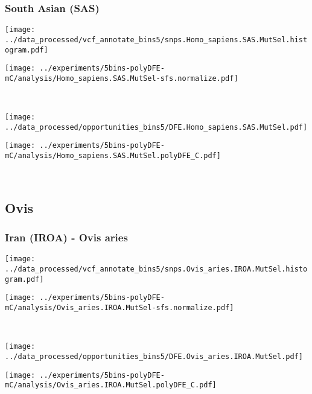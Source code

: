 \subsubsection{South Asian (SAS)}

\begin{minipage}{0.49\linewidth}
    \texttt{[image: ../data\_processed/vcf\_annotate\_bins5/snps.Homo\_sapiens.SAS.MutSel.histogram.pdf]}
\end{minipage}
\begin{minipage}{0.49\linewidth}
    \texttt{[image: ../experiments/5bins-polyDFE-mC/analysis/Homo\_sapiens.SAS.MutSel-sfs.normalize.pdf]}
\end{minipage}
\\
\begin{minipage}{0.49\linewidth}
    \texttt{[image: ../data\_processed/opportunities\_bins5/DFE.Homo\_sapiens.SAS.MutSel.pdf]}
\end{minipage}
\begin{minipage}{0.49\linewidth}
    \texttt{[image: ../experiments/5bins-polyDFE-mC/analysis/Homo\_sapiens.SAS.MutSel.polyDFE\_C.pdf]}
\end{minipage}
\\

\subsection{Ovis}

\subsubsection{Iran (IROA) - Ovis aries}

\begin{minipage}{0.49\linewidth}
    \texttt{[image: ../data\_processed/vcf\_annotate\_bins5/snps.Ovis\_aries.IROA.MutSel.histogram.pdf]}
\end{minipage}
\begin{minipage}{0.49\linewidth}
    \texttt{[image: ../experiments/5bins-polyDFE-mC/analysis/Ovis\_aries.IROA.MutSel-sfs.normalize.pdf]}
\end{minipage}
\\
\begin{minipage}{0.49\linewidth}
    \texttt{[image: ../data\_processed/opportunities\_bins5/DFE.Ovis\_aries.IROA.MutSel.pdf]}
\end{minipage}
\begin{minipage}{0.49\linewidth}
    \texttt{[image: ../experiments/5bins-polyDFE-mC/analysis/Ovis\_aries.IROA.MutSel.polyDFE\_C.pdf]}
\end{minipage}
\\

